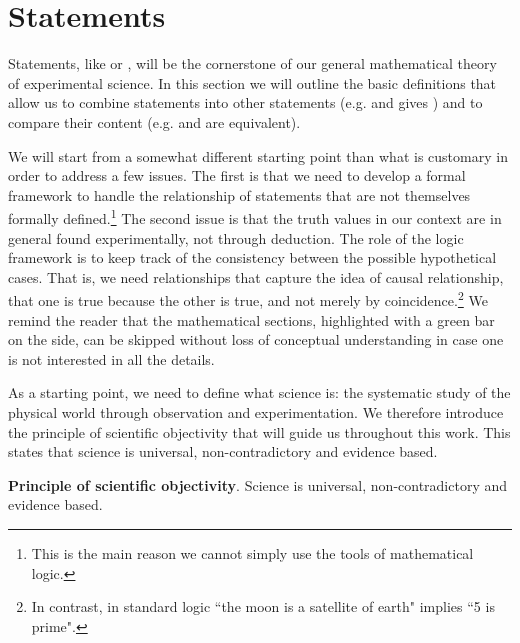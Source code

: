 \documentclass[11pt,letterpaper,fleqn]{memoir} %
\begin{document}
\section{Statements}

Statements, like  or , will be the cornerstone of our general mathematical theory of experimental science. In this section we will outline the basic definitions that allow us to combine statements into other statements (e.g.  and  gives ) and to compare their content (e.g.  and  are equivalent).

We will start from a somewhat different starting point than what is customary in order to address a few issues. The first is that we need to develop a formal framework to handle the relationship of statements that are not themselves formally defined.\footnote{This is the main reason we cannot simply use the tools of mathematical logic.} The second issue is that the truth values in our context are in general found experimentally, not through deduction. The role of the logic framework is to keep track of the consistency between the possible hypothetical cases. That is, we need relationships that capture the idea of causal relationship, that one is true because the other is true, and not merely by coincidence.\footnote{In contrast, in standard logic ``the moon is a satellite of earth" implies ``5 is prime".} We remind the reader that the mathematical sections, highlighted with a green bar on the side, can be skipped without loss of conceptual understanding in case one is not interested in all the details. 

As a starting point, we need to define what science is: the systematic study of the physical world through observation and experimentation. We therefore introduce the principle of scientific objectivity that will guide us throughout this work. This states that science is universal, non-contradictory and evidence based.

\begin{mathSection}
	\textbf{Principle of scientific objectivity}.
		Science is universal, non-contradictory and evidence based.
\end{mathSection}
\end{document}
